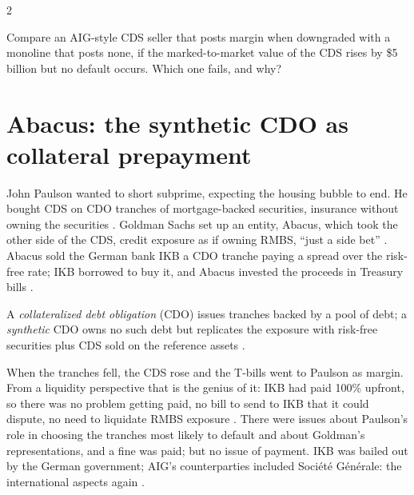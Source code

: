 \begin{paracol}{2}
\begin{exercise}
Compare an AIG-style CDS seller that posts margin when downgraded with a monoline that posts none, if the marked-to-market value of the CDS rises by \$5 billion but no
default occurs. Which one fails, and why?
\end{exercise}

\section{Abacus: the synthetic CDO as collateral prepayment}\label{sec:cds-abacus}

John Paulson wanted to short subprime, expecting the housing bubble to end. He bought CDS on CDO tranches of mortgage-backed securities, insurance without owning the
securities . Goldman Sachs set up an entity, Abacus, which took the other side of the CDS, credit exposure as if owning
RMBS, ``just a side bet'' . Abacus sold the German bank IKB a CDO tranche paying a spread over the risk-free rate; IKB
borrowed to buy it, and Abacus invested the proceeds in Treasury bills .

\begin{nfigure}
\begin{taccts}
\quad
{}\quad
{}
\end{taccts}
\caption{The synthetic CDO: T-bills plus a short CDS replicate a long position in mortgage-backed securities .}\label{fig:cds-abacus}
\end{nfigure}

\begin{definition}
A \emph{collateralized debt obligation} (CDO) issues tranches backed by a pool of debt; a \emph{synthetic} CDO owns no such debt but replicates the exposure with
risk-free securities plus CDS sold on the reference assets .
\end{definition}

When the tranches fell, the CDS rose and the T-bills went to Paulson as margin. From a liquidity perspective that is the genius of it: IKB had paid 100\% upfront,
so there was no problem getting paid, no bill to send to IKB that it could dispute, no need to liquidate RMBS exposure
. There were issues about Paulson's role in choosing the tranches most
likely to default and about Goldman's representations, and a fine was paid; but no issue of payment. IKB was bailed out by the German government; AIG's counterparties
included Soci\'et\'e G\'en\'erale: the international aspects again .


\end{paracol}

